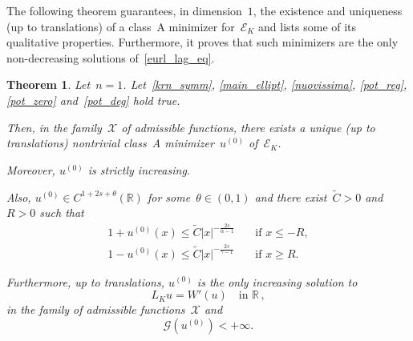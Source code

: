 \documentclass[10pt,a4paper]{amsart}
\newtheorem{theorem}{Theorem}[section]
\numberwithin{equation}{section}
\newcommand{\R}{\mathbb{R}}
\newcommand{\Ec}{\mathcal{E}_K}
\begin{document}
The following theorem guarantees, in dimension~$1$, the existence and uniqueness (up to translations) of a class~A minimizer for~$\Ec$ and lists some of its qualitative properties. Furthermore, it proves that such minimizers are the only non-decreasing solutions of~\eqref{eurl_lag_eq}. 

 \begin{theorem}\label{main_thm}
Let~$n=1$. Let~\eqref{krn_symm}, \eqref{main_ellipt}, \eqref{nuovissima}, \eqref{pot_reg}, \eqref{pot_zero} and~\eqref{pot_deg} hold true.
     	         
	         Then, in the family~$\mathcal{X}$ of admissible functions, there exists a unique (up to translations) nontrivial class~A minimizer~$u^{(0)}$ of~$\Ec$.
	         
	         Moreover, $u^{(0)}$         
	         is strictly increasing. 
	         
	         Also, $u^{(0)} \in C^{1+2s +{\theta}}(\R)$ for some~$\theta \in (0,1)$ and there exist~$\widetilde{C}> 0$ and~$R>0$ such that
          \begin{equation}\label{asymp_decay}
          	\begin{split}
          1+u^{(0)}(x) \leq \widetilde{C} |x|^{-\frac{2s}{\alpha-1}} &\quad\mbox{if } x\leq -R,\\   
         1 - u^{(0)}(x) \leq \widetilde{C}|x|^{-\frac{2s}{\gamma-1}} &\quad\mbox{if } x\geq R.
           \end{split}
          \end{equation}

Furthermore, up to translations, $u^{(0)}$ is the only increasing solution to
              \begin{equation}\label{ru3qio2ruebn68594}
                L_K u = W'(u) \quad \text{in } \R\,,
            \end{equation}  
            in the family of admissible functions~$\mathcal{X}$ and
\begin{equation*}
\mathcal{G}(u^{(0)}) <+\infty. 
\end{equation*}


\end{theorem}
\end{document}
